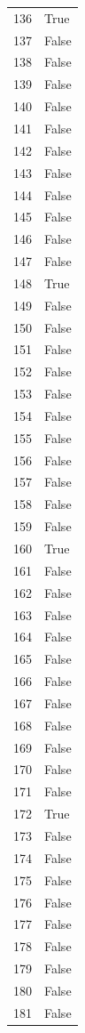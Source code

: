 \documentclass[
  letterpaper,
  DIV=11,
  numbers=noendperiod]{scrreprt}
\begin{document}
\begin{tabular}{ll}
136  &   True \\
137  &  False \\
138  &  False \\
139  &  False \\
140  &  False \\
141  &  False \\
142  &  False \\
143  &  False \\
144  &  False \\
145  &  False \\
146  &  False \\
147  &  False \\
148  &   True \\
149  &  False \\
150  &  False \\
151  &  False \\
152  &  False \\
153  &  False \\
154  &  False \\
155  &  False \\
156  &  False \\
157  &  False \\
158  &  False \\
159  &  False \\
160  &   True \\
161  &  False \\
162  &  False \\
163  &  False \\
164  &  False \\
165  &  False \\
166  &  False \\
167  &  False \\
168  &  False \\
169  &  False \\
170  &  False \\
171  &  False \\
172  &   True \\
173  &  False \\
174  &  False \\
175  &  False \\
176  &  False \\
177  &  False \\
178  &  False \\
179  &  False \\
180  &  False \\
181  &  False \\

\end{tabular}
\end{document}

